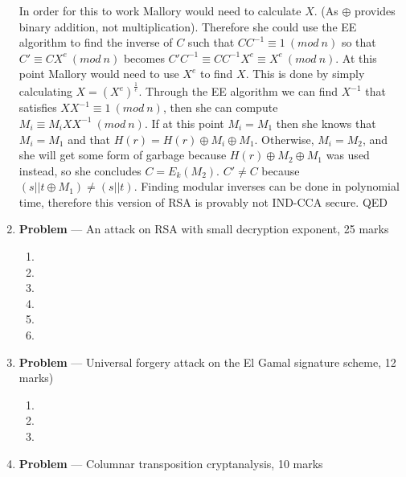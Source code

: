 \documentclass[11pt]{article}
\theoremstyle{definition}
\newcounter{problem}
\begin{document}
\begin{enumerate}
In order for this to work Mallory would need to calculate $X$. (As $\oplus$ provides binary addition, not multiplication). Therefore she could use the EE algorithm to find the inverse of $C$ such that $CC^{-1} \equiv 1\ (mod\ n)$ so that $C' \equiv CX^e\ (mod\ n)$ becomes $C'C^{-1} \equiv CC^{-1}X^e \equiv X^e\ (mod\ n)$. At this point Mallory would need to use $X^e$ to find $X$. This is done by simply calculating $X = (X^e)^{\frac{1}{e}}$. Through the EE algorithm we can find $X^{-1}$ that satisfies $XX^{-1} \equiv 1\ (mod\ n)$, then she can compute $M_i \equiv M_iXX^{-1}\ (mod\ n)$. If at this point $M_i = M_1$ then she knows that $M_i = M_1$ and that $H(r) = H(r) \oplus M_i \oplus M_1$. Otherwise, $M_i = M_2$, and she will get some form of garbage because $H(r) \oplus M_2 \oplus M_1$ was used instead, so she concludes $C = E_k(M_2)$. $C' \ne C$ because $(s || t \oplus M_1) \ne (s || t)$. Finding modular inverses can be done in polynomial time, therefore this version of RSA is provably not IND-CCA secure. QED 


\newpage

\item[]  \textbf{Problem \theproblem} --- An attack on RSA with small decryption exponent, 25
    marks

\begin{enumerate}

\item %

\item %

\item %

\item %

\item %

\item %

\end{enumerate}

\newpage

\item[] \textbf{Problem \theproblem} --- Universal forgery attack on the El Gamal signature
    scheme, 12 marks)

\begin{enumerate}

\item %

\item %

\item %

\end{enumerate}

\newpage

 

\item[] \textbf{Problem \theproblem} --- Columnar transposition cryptanalysis, 10 marks

\end{enumerate}
\end{document}

